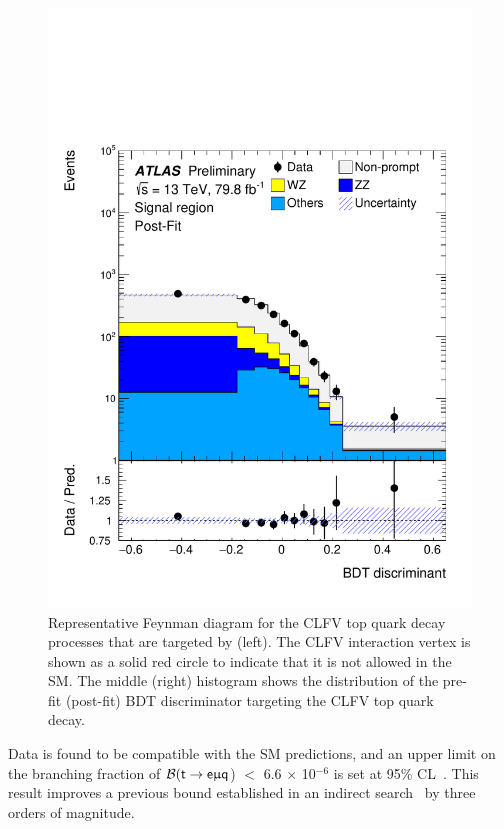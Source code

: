 \begin{figure}[tbh!]
\begin{center}
\begin{minipage}[b]{0.325\linewidth}
 \end{minipage}
 \hfill
 \begin{minipage}[b]{0.325\linewidth} 
 \includegraphics[width=\textwidth]{figures/Part3/History/ATLAS_results2}
 \end{minipage}
 \caption{Representative Feynman diagram for the \ac{CLFV} top quark decay processes that are targeted by \cite{ATLAS-CONF-2018-044} (left). The \ac{CLFV} interaction vertex is shown as a solid red circle to indicate that it is not allowed in the \ac{SM}. The middle (right) histogram shows the distribution of the pre-fit (post-fit) \ac{BDT} discriminator targeting the \ac{CLFV} top quark decay. }
 \label{fig:ATLAS_results1}
 \end{center}
\end{figure}

Data is found to be compatible with the \ac{SM} predictions, and an upper limit on the branching fraction of $\mathcal{B}(\textsf{t}\rightarrow\textsf{e}\upmu\textsf{q}$) $<$ 6.6 $\times$ 10$^{-6}$ is set at 95\% \ac{CL}~\cite{Read2002}. This result improves a previous bound established in an indirect search~\cite{Davidson:2015zza} by three orders of magnitude. 


